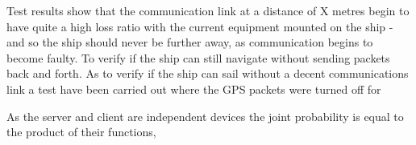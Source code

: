 Test results show that the communication link at a distance of X metres begin to have quite a high loss ratio with the current equipment mounted on the ship - and so the ship should never be further away, as communication begins to become faulty. To verify if the ship can still navigate without sending packets back and forth. As to verify if the ship can sail without a decent communications link a test have been carried out where the GPS packets were turned off for 

As the server and client are independent devices the joint probability is equal to the product of their functions, 